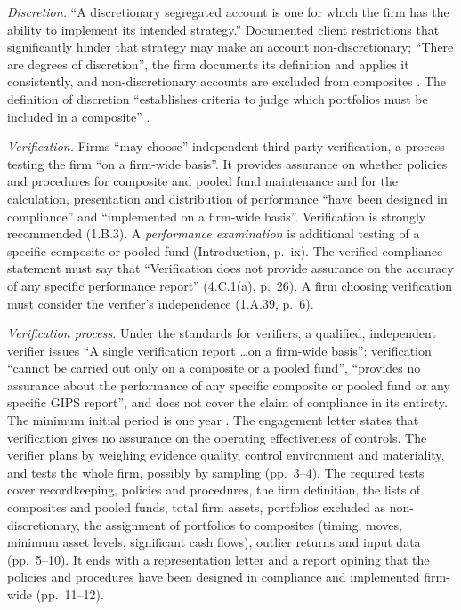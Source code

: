 \begin{qfdefinition}
\emph{Discretion.} ``A discretionary segregated account is one for which the firm has the ability to implement its intended strategy.'' Documented client restrictions that significantly hinder that strategy may make an account non-discretionary; ``There are degrees of discretion'', the firm documents its definition and applies it consistently, and non-discretionary accounts are excluded from composites \citep[Provision 3.A.2, p.~147]{gips-handbook-firms-2020}. The definition of discretion ``establishes criteria to judge which portfolios must be included in a composite'' \citep[Introduction, p.~xiii]{wide-gips-2020}.

\emph{Verification.} Firms ``may choose'' independent third-party verification, a process testing the firm ``on a firm-wide basis''. It provides assurance on whether policies and procedures for composite and pooled fund maintenance and for the calculation, presentation and distribution of performance ``have been designed in compliance'' and ``implemented on a firm-wide basis''. Verification is strongly recommended (1.B.3). A \emph{performance examination} is additional testing of a specific composite or pooled fund (Introduction, p.~ix). The verified compliance statement must say that ``Verification does not provide assurance on the accuracy of any specific performance report'' (4.C.1(a), p.~26). A firm choosing verification must consider the verifier's independence (1.A.39, p.~6).

\emph{Verification process.} Under the standards for verifiers, a qualified, independent verifier issues ``A single verification report \ldots on a firm-wide basis''; verification ``cannot be carried out only on a composite or a pooled fund'', ``provides no assurance about the performance of any specific composite or pooled fund or any specific GIPS report'', and does not cover the claim of compliance in its entirety. The minimum initial period is one year \citep[pp.~1--2]{gips-verifiers-2020}. The engagement letter states that verification gives no assurance on the operating effectiveness of controls. The verifier plans by weighing evidence quality, control environment and materiality, and tests the whole firm, possibly by sampling (pp.~3--4). The required tests cover recordkeeping, policies and procedures, the firm definition, the lists of composites and pooled funds, total firm assets, portfolios excluded as non-discretionary, the assignment of portfolios to composites (timing, moves, minimum asset levels, significant cash flows), outlier returns and input data (pp.~5--10). It ends with a representation letter and a report opining that the policies and procedures have been designed in compliance and implemented firm-wide (pp.~11--12).


\end{qfdefinition}
